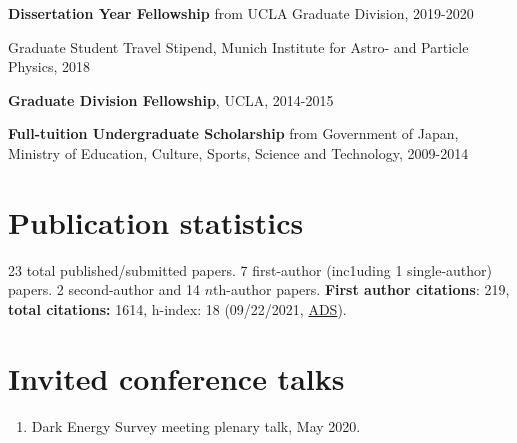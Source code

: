 \documentclass[margin, line]{res}
\begin{document}
\begin{resume}
\vspace*{-2.5mm}
\textbf{Dissertation Year Fellowship} from UCLA Graduate Division, 2019-2020%

\vspace*{-2.5mm}
Graduate Student Travel Stipend, {Munich Institute for Astro- and Particle Physics}, 2018%


\vspace*{-2.5mm}
\textbf{Graduate Division Fellowship}, UCLA, 2014-2015%

\vspace*{-2.5mm}
\textbf{Full-tuition Undergraduate Scholarship} from {Government of Japan, Ministry of Education, Culture, Sports, Science and Technology}, 2009-2014%

\section{\sc Publication statistics} 23 total published/submitted papers. {7 first-author (inc1uding 1 single-author) papers}. {2 second-author and 14 $n$th-author} papers. \textbf{First author citations}: 219, \textbf{total citations:} 1614, h-index: 18 (09/22/2021, \href{https://ui.adsabs.harvard.edu/user/libraries/NYgiA71JS4CR85Tt8CgJsw}{ADS}).
\vspace*{2.5mm}

\section{\sc Invited conference talks}
\begin{enumerate}

	\item Dark Energy Survey meeting plenary talk, May 2020.	 %
\end{enumerate}


\end{resume}
\end{document}
